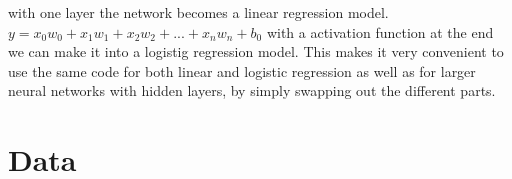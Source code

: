 \documentclass[twoside,11pt]{report}
\begin{document}
with one layer the network becomes a linear regression model. $y = x_0w_0 + x_1w_1 + x_2w_2 + ... + x_nw_n + b_0$ with a activation function at the end we can make it into a logistig regression model.
This makes it very convenient to use the same code for both linear and logistic regression as well as for 
larger neural networks with hidden layers, by simply swapping out the different parts.



\section{Data}
\label{sec:data}






\end{document}
